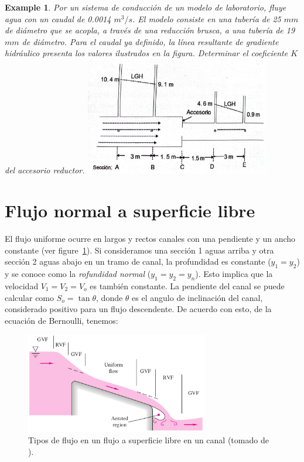 \documentclass[11pt, oneside]{article}
\newtheorem{exa}{Example}
\begin{document}
\begin{shaded}
\begin{exa}
Por un sistema de conducci\'on de un modelo de laboratorio, fluye agua con un caudal de 0.0014 $m^3/s$. El modelo consiste en una tuber\'ia de 25 $mm$ de di\'ametro que se acopla, a trav\'es de una reducci\'on brusca, a una tuber\'ia de 19 $mm$ de di\'ametro. Para el caudal ya definido, la l\'inea resultante de gradiente hidr\'aulico presenta los valores ilustrados en la figura. Determinar el coeficiente $K$ del accesorio reductor.
\includegraphics[width=8cm]{exa30.jpeg}
\end{exa}
\end{shaded}

\section{Flujo normal a superficie libre}
El flujo uniforme ocurre en largos y rectos canales con una pendiente y un ancho constante (ver figure~\ref{fnor1}). Si consideramos una secci\'on 1 aguas arriba y otra secci\'on 2 aguas abajo en un tramo de canal, la profundidad es constante ($y_1 = y_2$) y se conoce como la \emph{rofundidad normal} ($y_1 = y_2 = y_n$). Esto implica que la velocidad $V_1 = V_2 = V_o$ es tambi\'en constante. La pendiente del canal se puede calcular como $S_o = \tan \theta$, donde $\theta$ es el angulo de inclinaci\'on del canal, considerado positivo para un flujo descendente. De acuerdo con esto, de la ecuaci\'on de Bernoulli, tenemos:

\begin{figure}[h]
\centering
\includegraphics[width=8cm]{fnor1.png}
\caption{Tipos de flujo en un flujo a superficie libre en un canal (tomado de \cite{white1990fluid}).}
\label{fnor1}
\end{figure}
\end{document}

